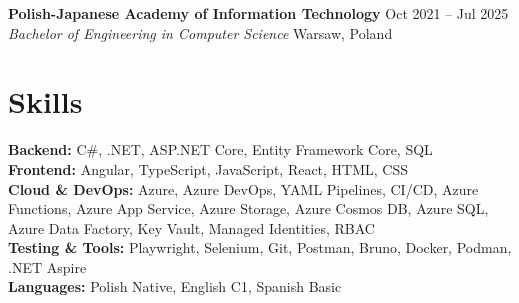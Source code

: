\documentclass[a4paper,10pt]{article}
\newcommand{\resumeSubheading}[4]{
  \textbf{#1} \hfill #2 \\
  \textit{#3} \hfill #4 \\
}
\begin{document}
\resumeSubheading
  {Polish-Japanese Academy of Information Technology}
  {Oct 2021 -- Jul 2025}
  {Bachelor of Engineering in Computer Science}
  {Warsaw, Poland}
  \vspace{-10pt}

\vspace{-4pt}

\section*{Skills}

\textbf{Backend:} C\#, .NET, ASP.NET Core, Entity Framework Core, SQL \\
\textbf{Frontend:} Angular, TypeScript, JavaScript, React, HTML, CSS \\
\textbf{Cloud \& DevOps:} Azure, Azure DevOps, YAML Pipelines, CI/CD,
Azure Functions, Azure App Service, Azure Storage, Azure Cosmos DB,
Azure SQL, Azure Data Factory, Key Vault, Managed Identities, RBAC \\
\textbf{Testing \& Tools:} Playwright, Selenium, Git, Postman, Bruno,
Docker, Podman, .NET Aspire \\
\textbf{Languages:} Polish Native, English C1, Spanish Basic
\end{document}
